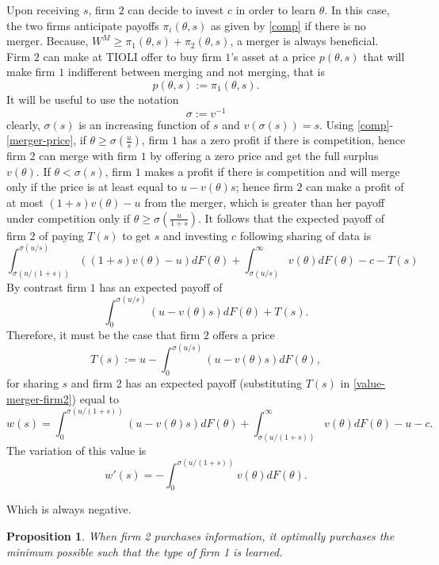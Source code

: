 \documentclass[a4paper,leqno]{article}%
\newtheorem{prop}{Proposition}
\renewcommand{\t}{\theta}
\newcommand{\s}{\sigma}
\begin{document}
Upon receiving $s$, firm $2$ can decide to invest $c$ in order to learn $\t$. In this case, the two firms anticipate payoffs $\pi_i(\t,s)$ as given by \eqref{comp} if there is no merger. Because, $W^M\geq \pi_1(\t,s)+\pi_2(\t,s)$, a merger is always beneficial. Firm $2$ can make at TIOLI offer to buy firm $1$'s asset at a price $p(\t,s)$ that will make firm $1$ indifferent between merging and not merging, that is 
%
\begin{equation}\label{merger-price}
    p(\t,s):=\pi_1(\t,s).  
\end{equation}
%
It will be useful to use the notation
%
\[
\s:=v^{-1}
\]
clearly, $\s(s)$ is an increasing function of $s$ and $v(\s(s))=s$. Using \eqref{comp}-\eqref{merger-price}, if $\t\geq \s(\frac{u}{s})$, firm $1$ has a zero profit if there is competition, hence firm $2$ can merge with firm $1$ by offering a zero price and get the full surplus $v(\t)$. If $\t< \s(s)$, firm $1$ makes a profit if there is competition and will merge only if the price is at least equal to $u-v(\t)s$; hence firm $2$ can make a profit of at most $(1+s)v(\t)-u$ from the merger, which is greater than her payoff under competition only if $\t\geq \s(\frac{u}{1+s})$. It follows that the expected payoff of firm $2$ of paying $T(s)$ to get $s$ and investing $c$ following sharing of data is 
%
\begin{equation}\label{value-merger-firm2}
    \int_{\s(u/(1+s))}^{\s(u/s)} ((1+s)v(\t)-u)dF(\t)+\int_{\s(u/s)}^\infty v(\t)dF(\t)-c-T(s)
\end{equation}
%
By contrast firm $1$ has an expected payoff of 
\begin{equation}\label{value-merger-firm1}
    \int_{0}^{\s(u/s)}(u-v(\t)s)dF(\t)+T(s).
\end{equation}
%
Therefore, it must be the case that firm $2$ offers a price
%
\[
T(s):=u-\int_{0}^{\s(u/s)}(u-v(\t)s)dF(\t),
\]
%
for sharing $s$ and firm 2 has an expected payoff (substituting $T(s)$ in \eqref{value-merger-firm2}) equal to 
%
\[
w(s)=\int_0^{\s(u/(1+s))}(u-v(\t)s)dF(\t)+\int_{\s(u/(1+s))}^\infty v(\t)dF(\t)-u-c.
\]
%
The variation of this value is
%
\[
w'(s)= -\int_0^{\s(u/(1+s))}v(\t)dF(\t).
\]


Which is always negative. 

\begin{prop}

When firm 2 purchases information, it optimally purchases the minimum possible such that the type of firm 1 is learned. 

\end{prop}
\end{document}
